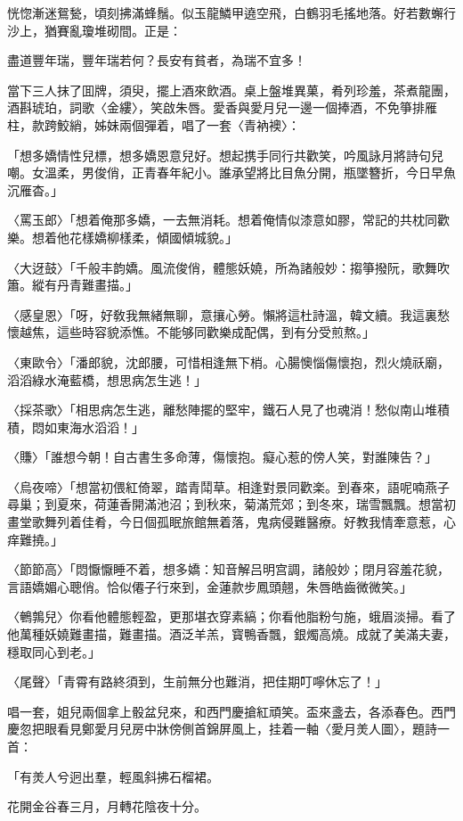 恍惚漸迷鴛甃，頃刻拂滿蜂鬚。似玉龍鱗甲遶空飛，白鶴羽毛搖地落。好若數蠏行沙上，猶賽亂瓊堆砌間。正是：

盡道豐年瑞，豐年瑞若何？長安有貧者，為瑞不宜多！

當下三人抹了囬牌，須臾，擺上酒來飲酒。桌上盤堆異菓，肴列珍羞，茶煮龍團，酒斟琥珀，詞歌〈金縷〉，笑啟朱唇。愛香與愛月兒一邊一個捧酒，不免箏排雁柱，款跨鮫綃，姊妹兩個彈着，唱了一套〈青衲襖〉：

「想多嬌情性兒標，想多嬌恩意兒好。想起携手同行共歡笑，吟風詠月將詩句兒嘲。女溫柔，男俊俏，正青春年紀小。誰承望將比目魚分開，瓶墜簪折，今日早魚沉雁杳。」

〈罵玉郎〉「想着俺那多嬌，一去無消耗。想着俺情似漆意如膠，常記的共枕同歡樂。想着他花樣嬌柳樣柔，傾國傾城貌。」

〈大迓鼓〉「千般丰韵嬌。風流俊俏，體態妖嬈，所為諸般妙：搊箏撥阮，歌舞吹簫。縱有丹青難畫描。」

〈感皇恩〉「呀，好敎我無緒無聊，意攘心勞。懶將這杜詩溫，韓文續。我這裏愁懷越焦，這些時容貌添憔。不能够同歡樂成配偶，到有分受煎熬。」

〈東歐令〉「潘郎貌，沈郎腰，可惜相逢無下梢。心腸懊惱傷懷抱，烈火燒祅廟，滔滔綠水淹藍橋，想思病怎生逃！」

〈採茶歌〉「相思病怎生逃，離愁陣擺的堅牢，鐵石人見了也魂消！愁似南山堆積積，悶如東海水滔滔！」

〈賺〉「誰想今朝！自古書生多命薄，傷懷抱。癡心惹的傍人笑，對誰陳告？」

〈烏夜啼〉「想當初偎紅倚翠，踏青鬦草。相逢對景同歡楽。到春來，語呢喃燕子尋巢；到夏來，荷蓮香開滿池沼；到秋來，菊滿荒郊；到冬來，瑞雪飄飄。想當初畫堂歌舞列着佳肴，今日個孤眠旅館無着落，鬼病侵難醫療。好教我情牽意惹，心痒難撓。」

〈節節高〉「悶懨懨睡不着，想多嬌：知音解吕明宫調，諸般妙；閉月容羞花貌，言語嬌媚心聰俏。恰似僊子行來到，金蓮款步鳳頭翹，朱唇皓齒微微笑。」

〈鵪鶉兒〉你看他體態輕盈，更那堪衣穿素縞；你看他脂粉勻施，蛾眉淡掃。看了他萬種妖嬈難畫描，難畫描。酒泛羊羔，寳鴨香飄，銀燭高燒。成就了美滿夫妻，穩取同心到老。」

〈尾聲〉「青霄有路終須到，生前無分也難消，把佳期叮嚀休忘了！」

唱一套，姐兒兩個拿上骰盆兒來，和西門慶搶紅頑笑。盃來盞去，各添春色。西門慶忽把眼看見鄭愛月兒房中牀傍側首錦屏風上，挂着一軸〈愛月羙人圖〉，題詩一首：

「有羙人兮迥出羣，輕風斜拂石榴裙。

花開金谷春三月，月轉花陰夜十分。

